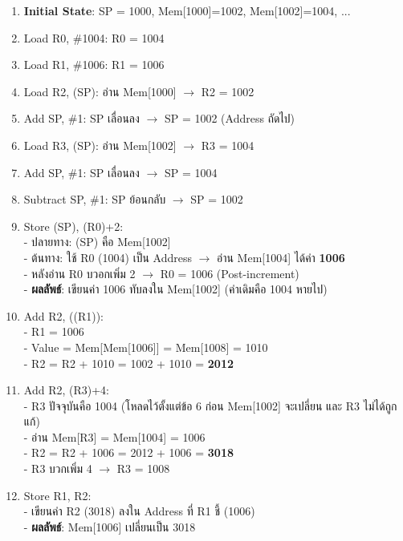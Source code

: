 \documentclass[a4paper,12pt]{article}
\begin{document}
\begin{enumerate}[label=\arabic*.]
    \item \textbf{Initial State}: SP = 1000, Mem[1000]=1002, Mem[1002]=1004, ...
    \item Load R0, \#1004: R0 = 1004
    \item Load R1, \#1006: R1 = 1006
    \item Load R2, (SP): อ่าน Mem[1000] $\to$ R2 = 1002
    \item Add SP, \#1: SP เลื่อนลง $\to$ SP = 1002 (Address ถัดไป)
    \item Load R3, (SP): อ่าน Mem[1002] $\to$ R3 = 1004
    \item Add SP, \#1: SP เลื่อนลง $\to$ SP = 1004
    \item Subtract SP, \#1: SP ย้อนกลับ $\to$ SP = 1002
    \item Store (SP), (R0)+2: 
    \\ - ปลายทาง: (SP) คือ Mem[1002]
    \\ - ต้นทาง: ใช้ R0 (1004) เป็น Address $\to$ อ่าน Mem[1004] ได้ค่า \textbf{1006}
    \\ - หลังอ่าน R0 บวอกเพิ่ม 2 $\to$ R0 = 1006 (Post-increment)
    \\ - \textbf{ผลลัพธ์}: เขียนค่า 1006 ทับลงใน Mem[1002] (ค่าเดิมคือ 1004 หายไป)
    \item Add R2, ((R1)):
    \\ - R1 = 1006
    \\ - Value = Mem[Mem[1006]] = Mem[1008] = 1010
    \\ - R2 = R2 + 1010 = 1002 + 1010 = \textbf{2012}
    \item Add R2, (R3)+4:
    \\ - R3 ปัจจุบันคือ 1004 (โหลดไว้ตั้งแต่ข้อ 6 ก่อน Mem[1002] จะเปลี่ยน และ R3 ไม่ได้ถูกแก้)
    \\ - อ่าน Mem[R3] = Mem[1004] = 1006
    \\ - R2 = R2 + 1006 = 2012 + 1006 = \textbf{3018}
    \\ - R3 บวกเพิ่ม 4 $\to$ R3 = 1008
    \item Store R1, R2:
    \\ - เขียนค่า R2 (3018) ลงใน Address ที่ R1 ชี้ (1006)
    \\ - \textbf{ผลลัพธ์}: Mem[1006] เปลี่ยนเป็น 3018
\end{enumerate}
\end{document}
